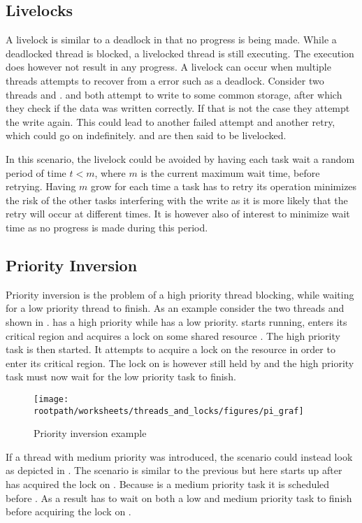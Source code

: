 \subsection{Livelocks} A livelock is similar to a deadlock in that no progress is being made. While a deadlocked thread is blocked, a livelocked thread is still executing. The execution does however not result in any progress. A livelock can occur when multiple threads attempts to recover from a error such as a deadlock\cite[p. 457]{tanenbaum2008modern}. Consider two threads  and .  and  both attempt to write to some common storage, after which they check if the data was written correctly. If that is not the case they attempt the write again. This could lead to another failed attempt and another retry, which could go on indefinitely.  and  are then said to be livelocked.

In this scenario, the livelock could be avoided by having each task wait a random period of time $t < m$, where $m$ is the current maximum wait time, before retrying. Having $m$ grow for each time a task has to retry its operation minimizes the risk of the other tasks interfering with the write as it is more likely that the retry will occur at different times. It is however also of interest to minimize wait time as no progress is made during this period.

\subsection{Priority Inversion}
Priority inversion is the problem of a high priority thread blocking, while waiting for a low priority thread to finish\cite[p. 456]{tanenbaum2008modern}. As an example consider the two threads  and  shown in .  has a high priority while  has a low priority.  starts running, enters its critical region and acquires a lock on some shared resource . The high priority task  is then started. It attempts to acquire a lock on the resource  in order to enter its critical region. The lock on  is however still held by  and the high priority task  must now wait for the low priority task  to finish.

\begin{figure}[htbp]
\centering
 \texttt{[image: \\rootpath/worksheets/threads\_and\_locks/figures/pi\_graf]} 
 \caption{Priority inversion example}
\label{fig:priority_inversion}
\end{figure}
If a thread  with medium priority was introduced, the scenario could instead look as depicted in . The scenario is similar to the previous but here  starts up after  has acquired the lock on . Because  is a medium priority task it is scheduled before . As a result  has to wait on both a low and medium priority task to finish before acquiring the lock on .

